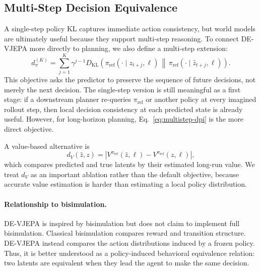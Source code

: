 \documentclass[10pt,twocolumn]{article}
\theoremstyle{tightstyle}
\begin{document}
\subsection{Multi-Step Decision Equivalence}
\label{sec:multistep}

A single-step policy KL captures immediate action consistency, but world models are
ultimately useful because they support multi-step reasoning.
To connect DE-VJEPA more directly to planning, we also define a multi-step extension:
\begin{equation}
  d_{\pi}^{(K)}
  =
  \sum_{j=1}^{K}
  \gamma^{j-1}
  D_{\mathrm{KL}}\!\left(
  \pi_{\mathrm{ref}}(\cdot \mid z_{t+j},\ell)
  \,\middle\|\,
  \pi_{\mathrm{ref}}(\cdot \mid \hat z_{t+j},\ell)
  \right).
  \label{eq:multistep-dpi}
\end{equation}
This objective asks the predictor to preserve the sequence of future decisions,
not merely the next decision.
The single-step version is still meaningful as a first stage: if a downstream
planner re-queries $\pi_{\mathrm{ref}}$ or another policy at every imagined rollout
step, then local decision consistency at each predicted state is already useful.
However, for long-horizon planning, Eq.~\eqref{eq:multistep-dpi} is the more direct
objective.

A value-based alternative is
\begin{equation}
  d_V(\hat z,z)
  =
  \left|
  V^{\pi_{\mathrm{ref}}}(\hat z,\ell)
  -
  V^{\pi_{\mathrm{ref}}}(z,\ell)
  \right|,
  \label{eq:value-distance}
\end{equation}
which compares predicted and true latents by their estimated long-run value.
We treat $d_V$ as an important ablation rather than the default objective, because
accurate value estimation is harder than estimating a local policy distribution.

\paragraph{Relationship to bisimulation.}
DE-VJEPA is inspired by bisimulation but does not claim to implement full
bisimulation.
Classical bisimulation compares reward and transition structure.
DE-VJEPA instead compares the action distributions induced by a frozen policy.
Thus, it is better understood as a policy-induced behavioral equivalence relation:
two latents are equivalent when they lead the agent to make the same decision.

\end{document}
